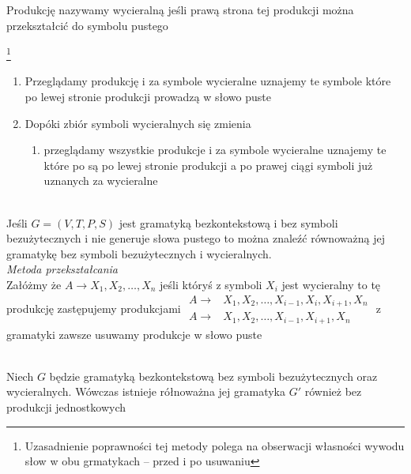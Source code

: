 	\begin{df}
		Produkcję nazywamy wycieralną jeśli prawą strona tej produkcji można przekształcić do symbolu pustego
	\end{df}			
	
	\begin{alg}\footnote{Uzasadnienie poprawności tej metody polega na 
	obserwacji własności wywodu słow w obu grmatykach -- przed i po usuwaniu}~\\
		\begin{enumerate}
			\item Przeglądamy produkcję i za symbole wycieralne uznajemy te symbole które po lewej stronie produkcji 
			prowadzą w słowo puste
			\item Dopóki zbiór symboli wycieralnych się zmienia
			\begin{enumerate}
				\item przeglądamy wszystkie produkcje i za symbole wycieralne uznajemy te które po są po lewej stronie
				produkcji a po prawej ciągi symboli już uznanych za wycieralne
			\end{enumerate}
		\end{enumerate}
	\end{alg}
	
	\begin{df}~\\
		Jeśli $G = (V, T, P, S)$ jest gramatyką bezkontekstową i bez symboli bezużytecznych i nie generuje słowa pustego
		to można znaleźć równoważną jej gramatykę bez symboli bezużytecznych i wycieralnych.\\
		\emph{Metoda przekształcania}\\
		Załóżmy że $A \to X_1,X_2,\dots,X_n$ jeśli któryś z symboli $X_i$ jest wycieralny to tę produkcję zastępujemy produkcjami
		$\begin{matrix}
			A \to& X_1,X_2,\dots,X_{i-1},X_i,X_{i+1},X_n \\ A \to& X_1,X_2,\dots,X_{i-1},X_{i+1},X_n
		\end{matrix}$
		z gramatyki zawsze usuwamy produkcje w słowo puste
	\end{df}	
	
	\begin{lemat}~\\
		Niech $G$ będzie gramatyką bezkontekstową bez symboli bezużytecznych oraz wycieralnych. Wówczas 
		istnieje rółnoważna jej gramatyka $G'$ również bez produkcji jednostkowych
	\end{lemat}
	
